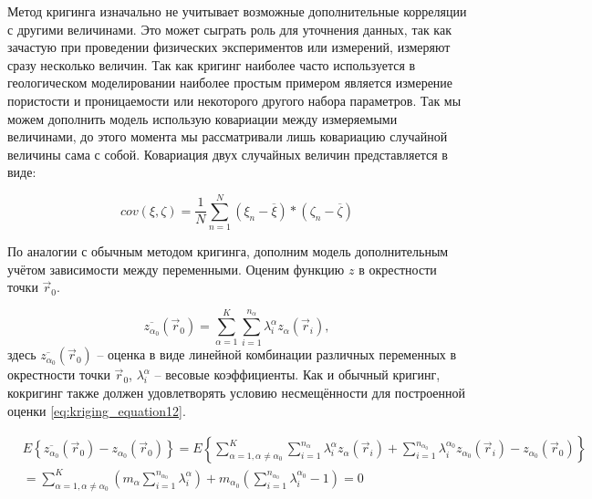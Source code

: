 Метод кригинга изначально не учитывает возможные дополнительные корреляции с другими величинами. Это может сыграть роль для уточнения данных, так как зачастую при проведении физических экспериментов или измерений, измеряют сразу несколько величин. Так как кригинг наиболее часто используется в геологическом моделировании наиболее простым примером является измерение пористости и проницаемости или некоторого другого набора параметров. Так мы можем дополнить модель использую ковариации между измеряемыми величинами, до этого момента мы рассматривали лишь ковариацию случайной величины сама с собой. Ковариация двух случайных величин представляется в виде:

\begin{equation}
  \label{eq:kriging_equation11}
  cov(\xi, \zeta) = \frac{1}{N} \sum_{n = 1}^N (\xi_n - \overline{\xi}) * (\zeta_n - \overline{\zeta})
\end{equation}

По аналогии с обычным методом кригинга, дополним модель дополнительным учётом зависимости между переменными. Оценим функцию $z$ в окрестности точки $\vec r_0$.  

\begin{equation}
  \label{eq:kriging_equation12}
  \overline{z_{\alpha_0}} (\vec r_0) = \sum_{\alpha = 1}^K \sum_{i = 1}^{n_\alpha} \lambda_{i}^{\alpha} z_{\alpha}(\vec r_i),
\end{equation}
здесь $\overline{z_{\alpha_0}} (\vec r_0)$ -- оценка в виде линейной комбинации различных переменных в окрестности точки $\vec r_0$, $\lambda_{i}^{\alpha}$ -- весовые коэффициенты. Как и обычный кригинг, кокригинг также должен удовлетворять условию несмещённости для построенной оценки \eqref{eq:kriging_equation12}.

\begin{align}
    & E \left\{ \overline{z_{\alpha_0}} (\vec r_0) - z_{\alpha_0} (\vec r_0) \right\} = E \left\{ \sum_{\alpha = 1, \alpha \neq \alpha_0}^K \sum_{i = 1}^{n_\alpha} \lambda_{i}^{\alpha} z_{\alpha}(\vec r_i) + \sum_{i = 1}^{n_{\alpha_0}} \lambda_i^{\alpha_0} z_{\alpha_0} (\vec r_i) - z_{\alpha_0} (\vec r_0) \right\} \nonumber \\
    & = \sum_{\alpha = 1, \alpha \neq \alpha_0} ^ K \left( m_\alpha \sum_{i = 1}^{n_{\alpha_0}} \lambda_i^\alpha \right)
    + m_{\alpha_0} \left( \sum_{i = 1}^{n_{\alpha_0}} \lambda_i^{\alpha_0} - 1 \right) = 0
\end{align}

